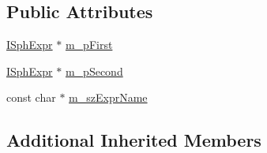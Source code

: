 \subsection*{Public Attributes}
\begin{DoxyCompactItemize}
\item 
\hyperlink{structISphExpr}{I\-Sph\-Expr} $\ast$ \hyperlink{structExpr__Binary__c_a9b9bdea341afa4088699418b12006436}{m\-\_\-p\-First}
\item 
\hyperlink{structISphExpr}{I\-Sph\-Expr} $\ast$ \hyperlink{structExpr__Binary__c_a8b3d918c626b20c45f8562255a8b6c2c}{m\-\_\-p\-Second}
\item 
const char $\ast$ \hyperlink{structExpr__Binary__c_a2ef9ef64fc8fae113cf5be3078743ae7}{m\-\_\-sz\-Expr\-Name}
\end{DoxyCompactItemize}
\subsection*{Additional Inherited Members}


